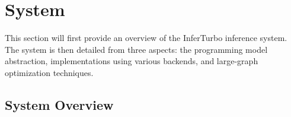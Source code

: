 \documentclass[conference]{IEEEtran}
\begin{document}
\section{System}
This section will first provide an overview of the InferTurbo inference system. The system is then detailed from three aspects: the programming model abstraction, implementations using various backends, and large-graph optimization techniques.

\subsection{System Overview}

\end{document}
